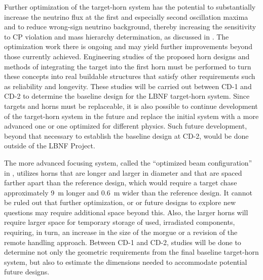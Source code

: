  
Further optimization of the target-horn system has the potential to substantially increase the neutrino flux at the first and especially second oscillation maxima and to reduce wrong-sign neutrino background, thereby increasing the sensitivity to CP 
violation and mass hierarchy determination, as discussed in \volphys.  The optimization work there is ongoing and may yield further improvements beyond those currently achieved. Engineering studies of the proposed horn designs and methods 
of integrating the target into the first horn must be performed to turn these concepts into real buildable structures that satisfy other requirements such as reliability and longevity.  These studies will be carried out between CD-1 and CD-2 to 
determine the baseline design for the LBNF target-horn system.  Since targets and horns must be replaceable, it is also possible to continue development of the target-horn system in the future and replace the initial system with a more advanced 
one or one optimized for different physics.  Such future development, beyond that necessary to establish the baseline design at CD-2, would be done outside of the LBNF Project.
 
The more advanced focusing system, called the ``optimized beam configuration'' in \volphys, utilizes horns that are longer and larger in diameter and that are spaced farther apart than the reference design, which would require a target chase approximately 9~m longer and 0.6~m wider 
than the reference design.  It cannot be ruled out that further optimization, or or future designs to explore new questions may require additional space beyond this.  Also, the larger horns will require larger 
space for temporary storage of used, irradiated components, requiring, in turn, an increase in the size of the morgue or a revision of the remote handling approach.  Between CD-1 and CD-2, studies will be done to determine not only the geometric 
requirements from the final baseline target-horn system, but also to estimate the dimensions needed to accommodate potential future designs.
 
